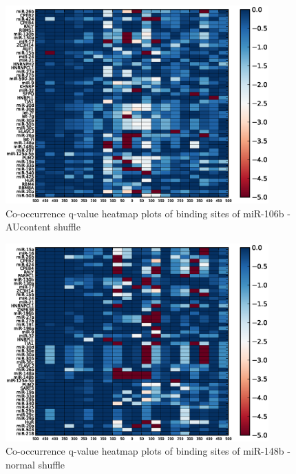 \begin{figure}
	\includegraphics[width=0.9\textwidth,clip]{appendix1/figures/miR-106b_AUcontent_expressed_heatmap_qvalues0.eps}
	\caption{Co-occurrence q-value heatmap plots of binding sites of miR-106b - AUcontent shuffle}
\end{figure}
\clearpage
\begin{figure}
   	\includegraphics[width=0.9\textwidth,clip]{appendix1/figures/miR-148b_normal_expressed_heatmap_qvalues0.eps}
   	\caption{Co-occurrence q-value heatmap plots of binding sites of miR-148b - normal shuffle}
\end{figure}

